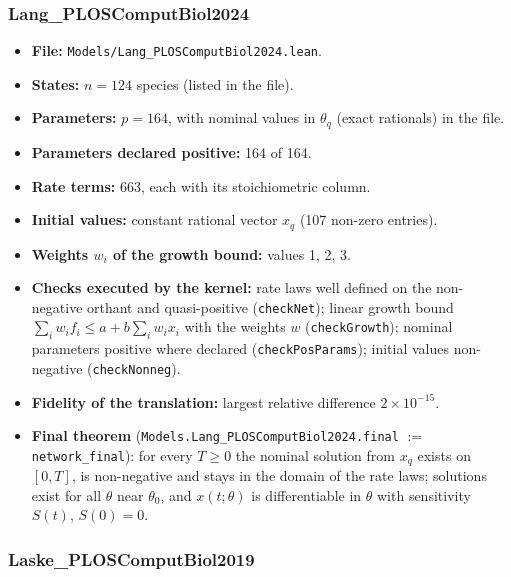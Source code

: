 \subsubsection*{Lang\_PLOSComputBiol2024}

\begin{itemize}\itemsep0pt\small
\item \textbf{File:} \texttt{Models/Lang\_PLOSComputBiol2024.lean}.
\item \textbf{States:} $n=124$ species (listed in the file).
\item \textbf{Parameters:} $p=164$, with nominal values in \texttt{$\theta_q$} (exact rationals) in the file.
\item \textbf{Parameters declared positive:} 164 of 164.
\item \textbf{Rate terms:} 663, each with its stoichiometric column.
\item \textbf{Initial values:} constant rational vector $x_q$ (107 non-zero entries).
\item \textbf{Weights $w_i$ of the growth bound:} values 1, 2, 3.
\item \textbf{Checks executed by the kernel:} rate laws well defined on the non-negative orthant and quasi-positive (\texttt{checkNet}); linear growth bound $\sum_iw_if_i\le a+b\sum_iw_ix_i$ with the weights $w$ (\texttt{checkGrowth}); nominal parameters positive where declared (\texttt{checkPosParams}); initial values non-negative (\texttt{checkNonneg}).
\item \textbf{Fidelity of the translation:} largest relative difference $2\times10^{-15}$.
\item \textbf{Final theorem} (\texttt{Models.Lang\_PLOSComputBiol2024.final} $:=$ \texttt{network\_final}): for every $T\ge0$ the nominal solution from $x_q$ exists on $[0,T]$, is non-negative and stays in the domain of the rate laws; solutions exist for all $\theta$ near $\theta_0$, and $x(t;\theta)$ is differentiable in $\theta$ with sensitivity $S(t)$, $S(0)=0$.
\end{itemize}

\subsubsection*{Laske\_PLOSComputBiol2019}

